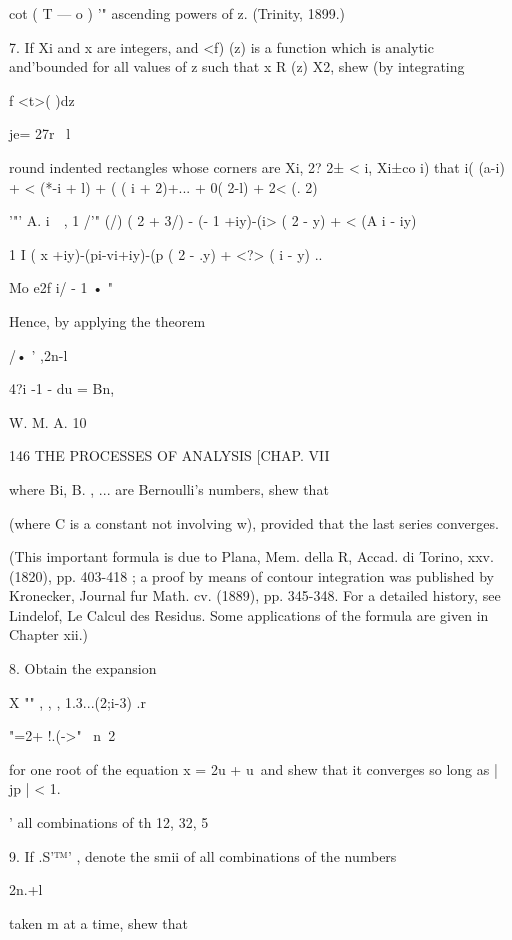 {{cot ( T — o ) '" ascending powers of z. (Trinity, 1899.) 

7. If Xi and x  are integers, and <f) (z) is a function which is analytic and'bounded for 
all values of z such that x R (z)  X2, shew (by integrating 

f <t>( )dz 

je= 27r  \ l 

round indented rectangles whose corners are Xi,  2?  2± <  i, Xi±co i) that 
i( (a-i) + < (*-i + l) + ( ( i + 2)+... + 0( 2-l) + 2< (. 2) 

'"'  A. i~\  ,  1 /'" (/) ( 2 +  3/) - (- 1 +iy)-(i> ( 2 -  y) + <  (A i - iy) 



1 I (   x  +iy)-(pi-vi+iy)-(p ( 2 -  .y) + <?> ( i -  y)  .. 

Mo e2f i/ - 1 • " 

Hence, by applying the theorem 

/• '  ,2n-l 

4?i -1  - du = Bn, 

W. M. A. 10 



146 THE PROCESSES OF ANALYSIS [CHAP. VII 

where Bi, B. , ... are Bernoulli's numbers, shew that 

(where C is a constant not involving w), provided that the last series converges. 

(This important formula is due to Plana, Mem. della R, Accad. di Torino, xxv. (1820), 
pp. 403-418 ; a proof by means of contour integration was published by Kronecker, 
Journal fur Math. cv. (1889), pp. 345-348. For a detailed history, see Lindelof, Le Calcul 
des Residus. Some applications of the formula are given in Chapter xii.) 

8. Obtain the expansion 

X "" , , , 1.3...(2;i-3) .r  

"=2+ !.(->"~  n\ 2  

for one root of the equation x = 2u + u\ and shew that it converges so long as | jp | < 1. 

' all combinations of th 
12, 32, 5%



9. If .S'™' , denote the smii of all combinations of the numbers 

2n.+l 



taken m at a time, shew that 

}}
